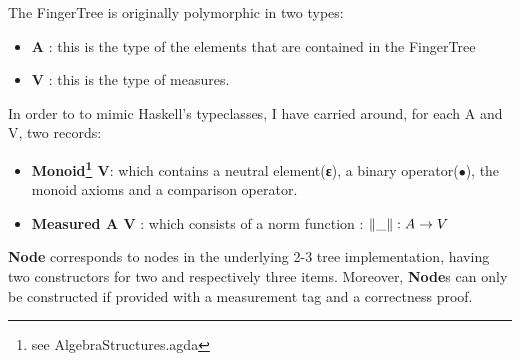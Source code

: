 \documentclass[12pt,twoside,notitlepage]{report}
\begin{document}
The FingerTree is originally polymorphic in two types:
\begin{itemize}
\item \textbf{A} : this is the type of the elements that are contained in the FingerTree 
\item \textbf{V} : this is the type of measures. 
\end{itemize} 

In order to to mimic Haskell's typeclasses, I have carried around, for each A and V, two records:

\begin{itemize} 
\item \textbf{Monoid\footnote{see AlgebraStructures.agda} V}: which contains a neutral element(\textbf{ε}), a binary operator(\textbf{$∙$}), the monoid axioms and a comparison operator.
\item \textbf{Measured A V} : which consists of a norm function  :  \textbf{$\Vert\_\Vert : \nolinebreak A \rightarrow V$}
\end{itemize} 

\textbf{Node} corresponds to nodes in the underlying 2-3 tree implementation, having two constructors for two and respectively three items. Moreover, \textbf{Node}s can only be constructed if provided with a measurement tag and a correctness proof.
  
\end{document}
